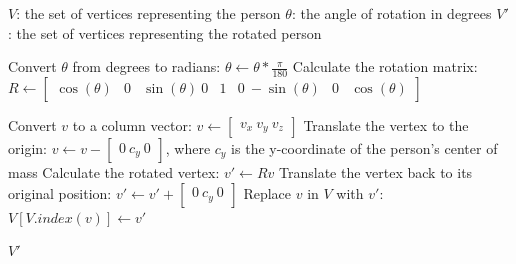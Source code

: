 \begin{algorithm}
\caption{How to get dizzy}\label{alg:dizzy}
\begin{algorithmic}
\Require $V$: the set of vertices representing the person
\Require $\theta$: the angle of rotation in degrees
\Ensure $V'$: the set of vertices representing the rotated person

\State Convert $\theta$ from degrees to radians: $\theta \gets \theta * \frac{\pi}{180}$
\State Calculate the rotation matrix: $R \gets \begin{bmatrix} \cos(\theta) & 0 & \sin(\theta) \ 0 & 1 & 0 \ -\sin(\theta) & 0 & \cos(\theta) \end{bmatrix}$

\State Convert $v$ to a column vector: $v \gets \begin{bmatrix} v_x \ v_y \ v_z \end{bmatrix}$
\State Translate the vertex to the origin: $v \gets v - \begin{bmatrix} 0 \ c_y \ 0 \end{bmatrix}$, where $c_y$ is the y-coordinate of the person's center of mass
\State Calculate the rotated vertex: $v' \gets Rv$
\State Translate the vertex back to its original position: $v' \gets v' + \begin{bmatrix} 0 \ c_y \ 0 \end{bmatrix}$
\State Replace $v$ in $V$ with $v'$: $V[V.index(v)] \gets v'$
\EndFor

\State \Return $V'$
\end{algorithmic}
\end{algorithm}
